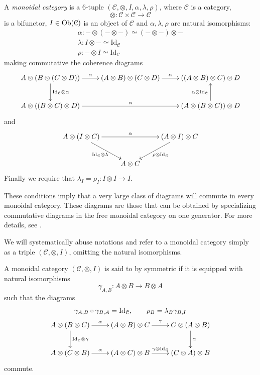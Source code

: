 \begin{refsection}
\begin{defin} \label{def monoidal category}
A \emph{monoidal category} is a 6-tuple $(\mathcal C, \otimes, I, \alpha, \lambda, \rho)$, where $\mathcal C$ is a category,
\[
\otimes \colon \mathcal C \times \mathcal C \to \mathcal C
\]
is a bifunctor, $I \in \operatorname{Ob}(\mathcal C)$ is an object of $\mathcal C$ and $\alpha, \lambda, \rho$ are natural isomorphisms:
\begin{gather*}
\alpha \colon - \otimes (- \otimes -) \simeq (- \otimes -) \otimes - \\
\lambda \colon I \otimes - \simeq \mathrm{Id}_{\mathcal C} \\
\rho \colon - \otimes I \simeq \mathrm{Id}_{\mathcal C}
\end{gather*}
making commutative the coherence diagrams
\[
\xymatrix{
A \otimes (B \otimes (C \otimes D)) \ar[d]^{\mathrm{Id}_{\mathcal C} \otimes \alpha} \ar[r]^-\alpha & (A \otimes B) \otimes (C \otimes D) \ar[r]^\alpha & ((A \otimes B) \otimes C) \otimes D \\ A \otimes ((B \otimes C) \otimes D) \ar[rr]^\alpha & & (A \otimes (B \otimes C)) \otimes D \ar[u]^{\alpha \otimes \mathrm{Id}_{\mathcal C}}
}
\]
and
\[
\xymatrix{
A \otimes (I \otimes C) \ar[rr]^-\alpha  \ar[dr]_{\mathrm{Id}_{\mathcal C} \otimes \lambda} & & (A \otimes I) \otimes C \ar[dl]^{\rho \otimes \mathrm{Id}_{\mathcal C}} \\ & A \otimes C
}
\]
Finally we require that $\lambda_I = \rho_I \colon I \otimes I \to I$.
\end{defin}

These conditions imply that a very large class of diagrams will commute in every monoidal category. These diagrams are those that can be obtained by specializing commutative diagrams in the free monoidal category on one generator. For more details, see \cite[Ch. VII.2]{cwm}.

\begin{rmk}
We will systematically abuse notations and refer to a monoidal category simply as a triple $(\mathcal C, \otimes, I)$, omitting the natural isomorphisms.
\end{rmk}

\begin{defin}
A monoidal category $(\mathcal C, \otimes, I)$ is said to by symmetric if it is equipped with natural isomorphisms
\[
\gamma_{A,B} \colon A \otimes B \to B \otimes A
\]
such that the diagrams
\begin{gather*}
\gamma_{A,B} \circ \gamma_{B,A} = \mathrm{Id}_{\mathcal C}, \qquad \rho_B = \lambda_B \gamma_{B,I} \\
\xymatrix{
A \otimes (B \otimes C) \ar[r]^-\alpha \ar[d]^{\mathrm{Id}_{\mathcal C} \otimes \gamma} & (A \otimes B) \otimes C \ar[r]^\gamma & C \otimes (A \otimes B) \ar[d]^\alpha \\ A \otimes (C \otimes B) \ar[r]^\alpha & (A \otimes C) \otimes B \ar[r]^{\gamma \otimes \mathrm{Id}_{\mathcal C}} & (C \otimes A) \otimes B
}
\end{gather*}
commute.
\end{defin}


\end{refsection}

